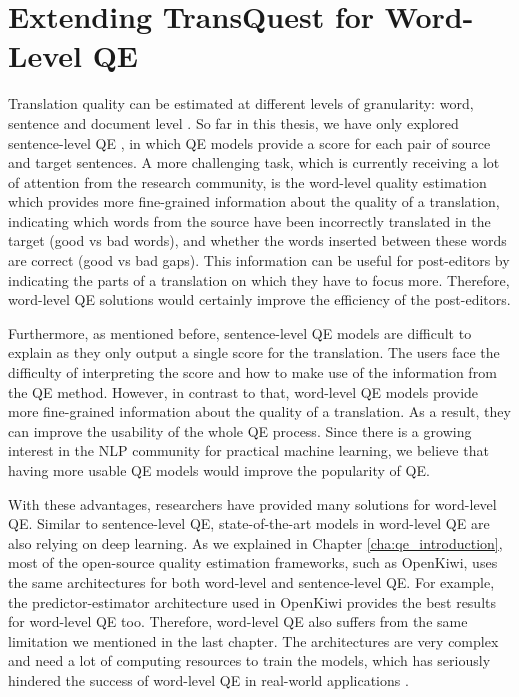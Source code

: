 \chapter{\label{cha:qe_word}Extending TransQuest for Word-Level QE}

Translation quality can be estimated at different levels of granularity: word, sentence and document level \autocite{ive-etal-2018-deepquest}. So far in this thesis, we have only explored sentence-level QE \autocite{specia-etal-2020-findings-wmt}, in which QE models provide a score for each pair of source and target sentences. A more challenging task, which is currently receiving a lot of attention from the research community, is the word-level quality estimation which provides more fine-grained information about the quality of a translation, indicating which words from the source have been incorrectly translated in the target (good vs bad words), and whether the words inserted between these words are correct (good vs bad gaps). This information can be useful for post-editors by indicating the parts of a translation on which they have to focus more. Therefore, word-level QE solutions would certainly improve the efficiency of the post-editors.

Furthermore, as mentioned before, sentence-level QE models are difficult to explain as they only output a single score for the translation. The users face the difficulty of interpreting the score and how to make use of the information from the QE method. However, in contrast to that, word-level QE models provide more fine-grained information about the quality of a translation. As a result, they can improve the usability of the whole QE process. Since there is a growing interest in the NLP community for practical machine learning, we believe that having more usable QE models would improve the popularity of QE.        

With these advantages, researchers have provided many solutions for word-level QE. Similar to sentence-level QE, state-of-the-art models in word-level QE are also relying on deep learning. As we explained in Chapter \ref{cha:qe_introduction}, most of the open-source quality estimation frameworks, such as OpenKiwi, uses the same architectures for both word-level and sentence-level QE. For example, the predictor-estimator architecture used in OpenKiwi provides the best results for word-level QE too. Therefore, word-level QE also suffers from the same limitation we mentioned in the last chapter. The architectures are very complex and need a lot of computing resources to train the models, which has seriously hindered the success of word-level QE in real-world applications \autocite{ranasinghe-etal-2021-exploratory}.

